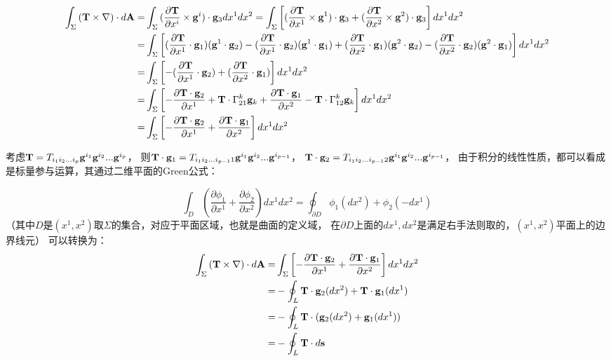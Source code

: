 \documentclass[UTF8,zihao=5]{ctexart}
\newcommand{\bm}[1]{{\mathbf{#1}}}
\newcommand*{\pd}[2]{\frac{\partial #1}{\partial #2}}
\begin{document}
$$
    \begin{aligned}
        \int_\Sigma{(\bm{T}\times\nb)\cdot d\bm{A}}
        = &
        \int_\Sigma{(\pd{\bm{T}}{x^i}\times\g^i)\cdot \g_3 dx^1dx^2}
        =
        \int_\Sigma{\left[(
                \pd{\bm{T}}{x^1}\times\g^1)\cdot \g_3
                +
                (\pd{\bm{T}}{x^2}\times\g^2)\cdot \g_3
        \right] dx^1dx^2} \\
        = &
        \int_\Sigma{\left[
                (\pd{\bm{T}}{x^1}\cdot\g_1)(\g^1\cdot\g_2)
                -
                (\pd{\bm{T}}{x^1}\cdot\g_2)(\g^1\cdot\g_1)
                +
                (\pd{\bm{T}}{x^2}\cdot\g_1)(\g^2\cdot\g_2)
                -
                (\pd{\bm{T}}{x^2}\cdot\g_2)(\g^2\cdot\g_1)
        \right] dx^1dx^2} \\
        = &
        \int_\Sigma{\left[
                -
                (\pd{\bm{T}}{x^1}\cdot\g_2)
                +
                (\pd{\bm{T}}{x^2}\cdot\g_1)
        \right] dx^1dx^2} \\
        = &
        \int_\Sigma{\left[
        -
        \pd{\bm{T}\cdot\g_2}{x^1}+\bm{T}\cdot\Gamma^k_{21}\g_k
        +
        \pd{\bm{T}\cdot\g_1}{x^2}-\bm{T}\cdot\Gamma^k_{12}\g_k
        \right] dx^1dx^2} \\
        = &
        \int_\Sigma{\left[
                -
                \pd{\bm{T}\cdot\g_2}{x^1}
                +
                \pd{\bm{T}\cdot\g_1}{x^2}
        \right] dx^1dx^2} \\
    \end{aligned}
$$

考虑$\bm{T}=T_{i_1i_2...i_p}\g^{i_1}\g^{i_2}...\g^{i_p}$，
则$\bm{T}\cdot\g_1=T_{i_1i_2...i_{p-1}1}\g^{i_1}\g^{i_2}...\g^{i_{p-1}}$，
$\bm{T}\cdot\g_2=T_{i_1i_2...i_{p-1}2}\g^{i_1}\g^{i_2}...\g^{i_{p-1}}$，
由于积分的线性性质，都可以看成是标量参与运算，其通过二维平面的Green公式：

$$
    \int_D{(\pd{\phi_1}{x^1}+\pd{\phi_2}{x^2})dx^1dx^2}
    =
    \oint_{\partial D}{\phi_1(dx^2)+\phi_2(-dx^1)}
$$
（其中$D$是$(x^1,x^2)$取$\Sigma$的集合，对应于平面区域，也就是曲面的定义域，
在$\partial D$上面的$dx^1,dx^2$是满足右手法则取的，$(x^1,x^2)$平面上的边界线元）
可以转换为：
$$
    \begin{aligned}
        \int_\Sigma{(\bm{T}\times\nb)\cdot d\bm{A}}
        = &
        \int_\Sigma{\left[
                -
                \pd{\bm{T}\cdot\g_2}{x^1}
                +
                \pd{\bm{T}\cdot\g_1}{x^2}
        \right] dx^1dx^2} \\
        = &
        -\oint_L{
            \bm{T}\cdot\g_2(dx^2)
            +
            \bm{T}\cdot\g_1(dx^1)
        }                 \\
        = &
        -\oint_L{
        \bm{T}\cdot
        (\g_2(dx^2)
        +\g_1(dx^1))
        }                 \\
        = &
        -\oint_L{
        \bm{T}\cdot
        d\bm{s}
        }                 \\
    \end{aligned}
$$
\end{document}
